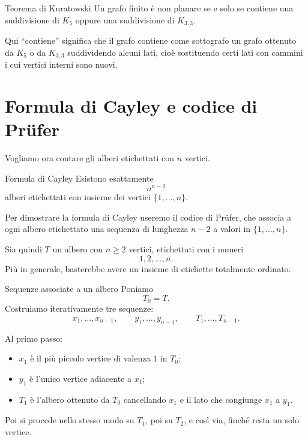\documentclass[a4paper]{article}
\begin{document}
\begin{snippettheorem}{Teorema di Kuratowski}
    Un grafo finito è non planare se e solo se contiene una suddivisione di \(K_5\) oppure una suddivisione di \(K_{3,3}\).

    Qui ``contiene'' significa che il grafo contiene come sottografo un grafo ottenuto da \(K_5\) o da \(K_{3,3}\) suddividendo alcuni lati, cioè sostituendo certi lati con cammini i cui vertici interni sono nuovi.
\end{snippettheorem}

\section{Formula di Cayley e codice di Prüfer}

Vogliamo ora contare gli alberi etichettati con \(n\) vertici.

\begin{snippettheorem}{Formula di Cayley}
    Esistono esattamente
    \[
        n^{n-2}
    \]
    alberi etichettati con insieme dei vertici \(\{1,\ldots,n\}\).
\end{snippettheorem}

Per dimostrare la formula di Cayley useremo il codice di Prüfer, che associa a ogni albero etichettato una sequenza di lunghezza \(n-2\) a valori in \(\{1,\ldots,n\}\).

Sia quindi \(T\) un albero con \(n\geq 2\) vertici, etichettati con i numeri
\[
    1,2,\ldots,n.
\]
Più in generale, basterebbe avere un insieme di etichette totalmente ordinato.

\begin{snippetdefinition}{Sequenze associate a un albero}
    Poniamo
    \[
        T_0=T.
    \]
    Costruiamo iterativamente tre sequenze:
    \[
        x_1,\ldots,x_{n-1},
        \qquad
        y_1,\ldots,y_{n-1},
        \qquad
        T_1,\ldots,T_{n-1}.
    \]

    Al primo passo:
    \begin{itemize}
        \item \(x_1\) è il più piccolo vertice di valenza \(1\) in \(T_0\);
        \item \(y_1\) è l'unico vertice adiacente a \(x_1\);
        \item \(T_1\) è l'albero ottenuto da \(T_0\) cancellando \(x_1\) e il lato che congiunge \(x_1\) a \(y_1\).
    \end{itemize}

    Poi si procede nello stesso modo su \(T_1\), poi su \(T_2\), e così via, finché resta un solo vertice.
\end{snippetdefinition}
\end{document}
